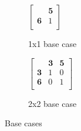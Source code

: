 \documentclass[11pt, oneside]{article} 	%
\begin{document}
\begin{figure}
\centering
\begin{subfigure}{.5\textwidth}
  \centering
  

$ \left[\begin{array}{cc}
                        &  \mathbf{5}\\ 
                        \mathbf{6} & 1\\
                      \end{array}\right] 
$

  \caption{1x1 base case}
\label{fig:basecase_1x1}
\end{subfigure}
\begin{subfigure}{.5\textwidth}
  \centering

$ \left[\begin{array}{ccc}
                        & \mathbf{3} & \mathbf{5}\\ 
                       \mathbf{3} & 1 & 0\\
                        \mathbf{6} & 0 & 1\\
                      \end{array}\right] 
$
  \caption{2x2 base case}
\label{fig:basecase_1x1}
\end{subfigure}
\caption{Base cases}
\label{fig:base}
\end{figure}
\end{document}
